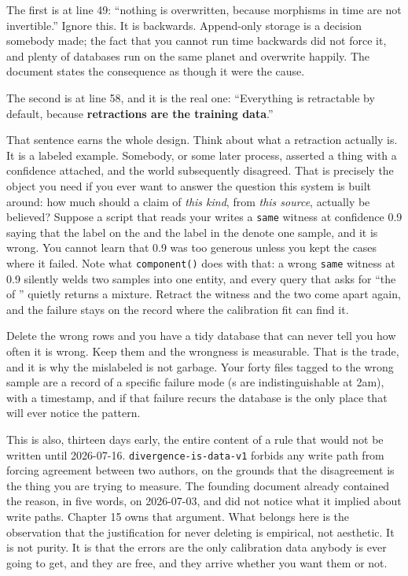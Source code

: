 The first is at line 49: ``nothing is overwritten, because morphisms in time are not invertible.'' Ignore this. It is backwards. Append-only storage is a decision somebody made; the fact that you cannot run time backwards did not force it, and plenty of databases run on the same planet and overwrite happily. The document states the consequence as though it were the cause.

The second is at line 58, and it is the real one: ``Everything is retractable by default, because \textbf{retractions are the training data}.''

That sentence earns the whole design. Think about what a retraction actually is. It is a labeled example. Somebody, or some later process, asserted a thing with a confidence attached, and the world subsequently disagreed. That is precisely the object you need if you ever want to answer the question this system is built around: how much should a claim of \emph{this kind}, from \emph{this source}, actually be believed? Suppose a script that reads your \labFabLog{} writes a \texttt{same} witness at confidence 0.9 saying that the label on the \labSampleCarrier{} and the label in the \labGrowthLog{} denote one sample, and it is wrong. You cannot learn that 0.9 was too generous unless you kept the cases where it failed. Note what \texttt{component()} does with that: a wrong \texttt{same} witness at 0.9 silently welds two samples into one entity, and every query that asks for ``the \labMeasurement{} of \labSample{}'' quietly returns a mixture. Retract the witness and the two come apart again, and the failure stays on the record where the calibration fit can find it.

Delete the wrong rows and you have a tidy database that can never tell you how often it is wrong. Keep them and the wrongness is measurable. That is the trade, and it is why the mislabeled \labRun{} is not garbage. Your forty \labFileFormat{} files tagged to the wrong sample are a record of a specific failure mode (\labSampleCarrier{}s are indistinguishable at 2am), with a timestamp, and if that failure recurs the database is the only place that will ever notice the pattern.

This is also, thirteen days early, the entire content of a rule that would not be written until 2026-07-16. \texttt{divergence-is-data-v1} forbids any write path from forcing agreement between two authors, on the grounds that the disagreement is the thing you are trying to measure. The founding document already contained the reason, in five words, on 2026-07-03, and did not notice what it implied about write paths. Chapter 15 owns that argument. What belongs here is the observation that the justification for never deleting is empirical, not aesthetic. It is not purity. It is that the errors are the only calibration data anybody is ever going to get, and they are free, and they arrive whether you want them or not.

